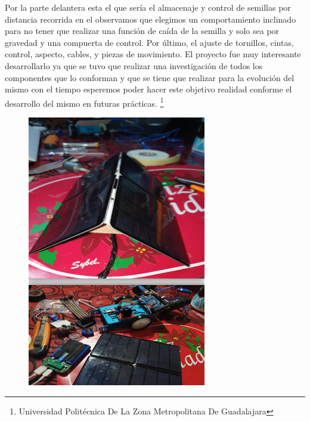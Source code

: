 \documentclass[11pt,a4paper]{article}
\begin{document}
Por la parte delantera esta el que sería el almacenaje y control de semillas por distancia recorrida en el observamos que elegimos un comportamiento inclinado para no tener que realizar una función de caída de la semilla y solo sea por gravedad y una compuerta de control.
Por último, el ajuste de tornillos, cintas, control, aspecto, cables, y piezas de movimiento. El proyecto fue muy interesante desarrollarlo ya que se tuvo que realizar una investigación de todos los componentes que lo conforman y que se tiene que realizar para la evolución del mismo con el tiempo esperemos poder hacer este objetivo realidad conforme el desarrollo del mismo en futuras prácticas.
 \footnote{Universidad Politécnica De La Zona Metropolitana De Guadalajara} 
\newpage
\begin{figure}[hbtp]
\centering
\includegraphics[scale=0.70]{02.png}
\end{figure} 
\end{document}
